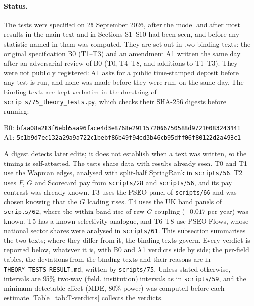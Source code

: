 \documentclass[11pt]{article}
\newcommand{\scr}[1]{\texttt{scripts/#1}}
\begin{document}
\paragraph{Status.} The tests were specified on 25 September 2026, after the model and after most results in the
main text and in Sections S1--S10 had been seen, and before any statistic named in them was computed. They are
set out in two binding texts: the original specification B0 (T1--T3) and an amendment A1 written the same day after
an adversarial review of B0 (T0, T4--T8, and additions to T1--T3). They were not publicly registered: A1 asks for a
public time-stamped deposit before any test is run, and none was made before they were run, on the same day. The
binding texts are kept verbatim in the docstring of \scr{75\_theory\_tests.py}, which checks their SHA-256 digests
before running:
\begin{center}\footnotesize
B0: \texttt{bfaa08a283f6ebb5aa96face4d3e8768e2911572066750588d97210083243441}\\
A1: \texttt{5e1b9d7ec132a29a9a722c1bebf86b49f94cd3b46cb95dff06f80122d2a498c1}
\end{center}
A digest detects later edits; it does not establish when a text was written, so the timing is self-attested. The
tests share data with results already seen. T0 and T1 use the Wapman edges, analysed with split-half SpringRank in
\scr{56}. T2 uses $F$, $G$ and Scorecard pay from \scr{28} and \scr{56}, and its pay contrast was already known.
T3 uses the PSEO panel of \scr{66} and was chosen knowing that the $G$ loading rises. T4 uses the UK band panels of
\scr{62}, where the within-band rise of raw $G$ coupling ($+0.017$ per year) was known. T5 has a known selectivity
analogue, and T6--T8 use PSEO Flows, whose national sector shares were analysed in \scr{61}. This subsection
summarises the two texts; where they differ from it, the binding texts govern. Every verdict is reported below,
whatever it is, with B0 and A1 verdicts side by side; the per-field tables, the deviations from the binding texts
and their reasons are in \texttt{THEORY\_TESTS\_RESULT.md}, written by \scr{75}. Unless stated otherwise,
intervals are 95\% two-way (field, institution) intervals as in \scr{59}, and the minimum detectable effect (MDE,
80\% power) was computed before each estimate. Table~\ref{tab:T-verdicts} collects the verdicts.
\end{document}
